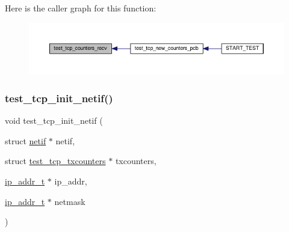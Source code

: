 Here is the caller graph for this function\+:
\nopagebreak
\begin{figure}[H]
\begin{center}
\leavevmode
\includegraphics[width=350pt]{openmote-cc2538_2lwip_2test_2unit_2tcp_2tcp__helper_8h_a6618a2d98d08a43995474cd3ef6704fc_icgraph}
\end{center}
\end{figure}
\mbox{\label{openmote-cc2538_2lwip_2test_2unit_2tcp_2tcp__helper_8h_adce5a273dd4854e4d2b6282265e9fdb7}} 
\subsubsection{\texorpdfstring{test\+\_\+tcp\+\_\+init\+\_\+netif()}{test\_tcp\_init\_netif()}}
{\footnotesize\ttfamily void test\+\_\+tcp\+\_\+init\+\_\+netif (\begin{DoxyParamCaption}\item[{struct \hyperlink{structnetif}{netif} $\ast$}]{netif,  }\item[{struct \hyperlink{structtest__tcp__txcounters}{test\+\_\+tcp\+\_\+txcounters} $\ast$}]{txcounters,  }\item[{\hyperlink{native_2lwip_2src_2include_2lwip_2ip__addr_8h_a88b43639738c4de2d3cd22e3a1fd7696}{ip\+\_\+addr\+\_\+t} $\ast$}]{ip\+\_\+addr,  }\item[{\hyperlink{native_2lwip_2src_2include_2lwip_2ip__addr_8h_a88b43639738c4de2d3cd22e3a1fd7696}{ip\+\_\+addr\+\_\+t} $\ast$}]{netmask }\end{DoxyParamCaption})}

